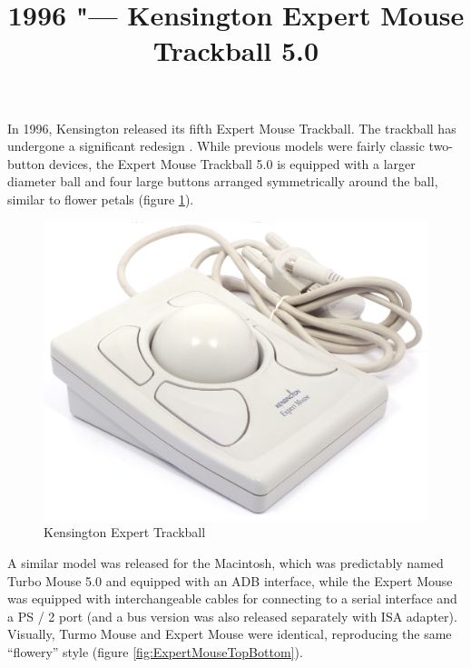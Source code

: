 \documentclass[11pt, a4paper]{article}
\begin{document}
\title{1996 "--- Kensington Expert Mouse Trackball 5.0}
\date{}
\maketitle

In 1996, Kensington released its fifth Expert Mouse Trackball. The trackball has undergone a significant redesign \cite{KensingtonPC}. While previous models were fairly classic two-button devices, the Expert Mouse Trackball 5.0 is equipped with a larger diameter ball and four large buttons arranged symmetrically around the ball, similar to flower petals (figure \ref{fig:ExpertMousePic}).

\begin{figure}[h]
    \centering
    \includegraphics[scale=0.4]{1996_kensington_expert_trackball_5/pic_60.jpg}
    \caption{Kensington Expert Trackball}
    \label{fig:ExpertMousePic}
\end{figure}

A similar model was released for the Macintosh, which was predictably named Turbo Mouse 5.0 \cite{KensingtonMac} and equipped with an ADB interface, while the Expert Mouse was equipped with interchangeable cables for connecting to a serial interface and a PS / 2 port (and a bus version was also released separately with ISA adapter). Visually, Turmo Mouse and Expert Mouse were identical, reproducing the same “flowery” style (figure \ref{fig:ExpertMouseTopBottom}).
\end{document}
